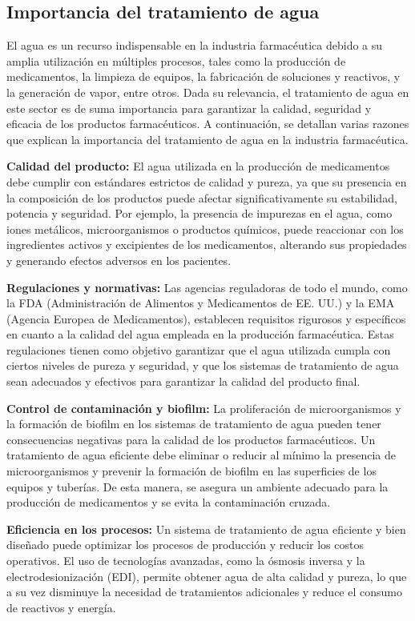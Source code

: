 \subsection{ Importancia del tratamiento de agua}
El agua es un recurso indispensable en la industria farmacéutica debido a su amplia utilización en múltiples procesos, tales como la producción de medicamentos, la limpieza de equipos, la fabricación de soluciones y reactivos, y la generación de vapor, entre otros. Dada su relevancia, el tratamiento de agua en este sector es de suma importancia para garantizar la calidad, seguridad y eficacia de los productos farmacéuticos. A continuación, se detallan varias razones que explican la importancia del tratamiento de agua en la industria farmacéutica.

\textbf{Calidad del producto:} El agua utilizada en la producción de medicamentos debe cumplir con estándares estrictos de calidad y pureza, ya que su presencia en la composición de los productos puede afectar significativamente su estabilidad, potencia y seguridad. Por ejemplo, la presencia de impurezas en el agua, como iones metálicos, microorganismos o productos químicos, puede reaccionar con los ingredientes activos y excipientes de los medicamentos, alterando sus propiedades y generando efectos adversos en los pacientes.

\textbf{Regulaciones y normativas:} Las agencias reguladoras de todo el mundo, como la FDA (Administración de Alimentos y Medicamentos de EE. UU.) y la EMA (Agencia Europea de Medicamentos), establecen requisitos rigurosos y específicos en cuanto a la calidad del agua empleada en la producción farmacéutica. Estas regulaciones tienen como objetivo garantizar que el agua utilizada cumpla con ciertos niveles de pureza y seguridad, y que los sistemas de tratamiento de agua sean adecuados y efectivos para garantizar la calidad del producto final.

\textbf{Control de contaminación y biofilm:} La proliferación de microorganismos y la formación de biofilm en los sistemas de tratamiento de agua pueden tener consecuencias negativas para la calidad de los productos farmacéuticos. Un tratamiento de agua eficiente debe eliminar o reducir al mínimo la presencia de microorganismos y prevenir la formación de biofilm en las superficies de los equipos y tuberías. De esta manera, se asegura un ambiente adecuado para la producción de medicamentos y se evita la contaminación cruzada.

\textbf{Eficiencia en los procesos:} Un sistema de tratamiento de agua eficiente y bien diseñado puede optimizar los procesos de producción y reducir los costos operativos. El uso de tecnologías avanzadas, como la ósmosis inversa y la electrodesionización (EDI), permite obtener agua de alta calidad y pureza, lo que a su vez disminuye la necesidad de tratamientos adicionales y reduce el consumo de reactivos y energía.

